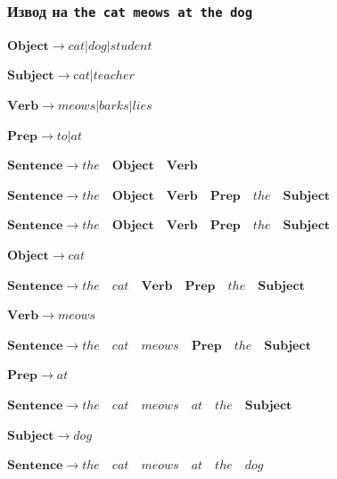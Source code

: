 \documentclass{beamer}
\begin{document}
\begin{frame}[fragile]
\frametitle{Извод на \texttt{the cat meows at the dog}}


\begin{flushright}


$\mathbf{Object} \rightarrow cat | dog | student$

$\mathbf{Subject} \rightarrow cat | teacher$

$\mathbf{Verb} \rightarrow meows | barks | lies$

$\mathbf{Prep} \rightarrow to | at$

$\mathbf{Sentence} \rightarrow the  \quad \mathbf{Object} \quad  \mathbf{Verb}$

$\mathbf{Sentence} \rightarrow the \quad \mathbf{Object}  \quad\mathbf{Verb}  \quad\mathbf{Prep} \quad the \quad \mathbf{Subject}$

\end{flushright}


\vspace{0.2cm}
\pause

$\mathbf{Sentence} \rightarrow the \quad \mathbf{Object}  \quad\mathbf{Verb}  \quad\mathbf{Prep} \quad the \quad \mathbf{Subject}$

\pause

\begin{flushright}
$\mathbf{Object} \rightarrow cat$
\end{flushright}

$\mathbf{Sentence} \rightarrow the \quad cat \quad\mathbf{Verb}  \quad\mathbf{Prep} \quad the \quad \mathbf{Subject}$



\pause

\begin{flushright}
$\mathbf{Verb} \rightarrow meows$
\end{flushright}

$\mathbf{Sentence} \rightarrow the \quad cat \quad meows  \quad\mathbf{Prep} \quad the \quad \mathbf{Subject}$

\pause

\begin{flushright}
$\mathbf{Prep} \rightarrow at$
\end{flushright}

$\mathbf{Sentence} \rightarrow the \quad cat \quad meows  \quad at \quad the \quad \mathbf{Subject}$



\pause

\begin{flushright}
$\mathbf{Subject} \rightarrow dog$
\end{flushright}

$\mathbf{Sentence} \rightarrow the \quad cat \quad meows  \quad at \quad the \quad dog$


\end{frame}
\end{document}
